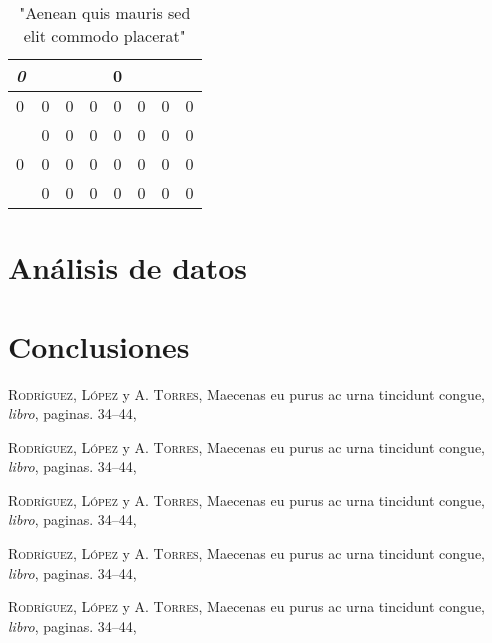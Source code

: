 \documentclass[letterpaper, 12px]{article}
\begin{document}
\begin{table}[h]
\centering
\begin{tabular}{|lll|lllllll|}
\hline
\multicolumn{3}{|l|}{\textit{0}}   & \multicolumn{7}{c|}{0}                                                                                                                             \\ 
\hline
\multicolumn{3}{|l|}{0}                  & \multicolumn{1}{l|}{0} & \multicolumn{1}{l|}{0} & \multicolumn{1}{l|}{0} & \multicolumn{1}{l|}{0} & \multicolumn{1}{l|}{0} & \multicolumn{1}{l|}{0} & 0 \\ 
\hline
\multicolumn{3}{|l|}{\multirow{3}{*}{0}} & \multicolumn{1}{l|}{0} & \multicolumn{1}{l|}{0} & \multicolumn{1}{l|}{0} & \multicolumn{1}{l|}{0} & \multicolumn{1}{l|}{0} & \multicolumn{1}{l|}{0} & 0 \\ 
\cline{4-10} 
\multicolumn{3}{|l|}{}                   & \multicolumn{1}{l|}{0} & \multicolumn{1}{l|}{0} & \multicolumn{1}{l|}{0} & \multicolumn{1}{l|}{0} & \multicolumn{1}{l|}{0} & \multicolumn{1}{l|}{0} & 0 \\ 
\cline{4-10} 
\multicolumn{3}{|l|}{}                   & \multicolumn{1}{l|}{0} & \multicolumn{1}{l|}{0} & \multicolumn{1}{l|}{0} & \multicolumn{1}{l|}{0} & \multicolumn{1}{l|}{0} & \multicolumn{1}{l|}{0} & 0 \\ 
\hline

\end{tabular}

\caption{"Aenean quis mauris sed elit commodo placerat"}
\label{tab:datos obtenidos pt2}
\end{table}

\lipsum[16]

\section{Análisis de datos}

\lipsum[17-18]
\section*{Conclusiones}
\lipsum[19-23]

\begin{thebibliography}{X}
 \textsc{Rodríguez, López} y \textsc{A. Torres}, Maecenas eu purus ac urna tincidunt congue,
\textit{libro}, paginas. 34--44,

 \textsc{Rodríguez, López} y \textsc{A. Torres}, Maecenas eu purus ac urna tincidunt congue,
\textit{libro}, paginas. 34--44,

 \textsc{Rodríguez, López} y \textsc{A. Torres}, Maecenas eu purus ac urna tincidunt congue,
\textit{libro}, paginas. 34--44,

 \textsc{Rodríguez, López} y \textsc{A. Torres}, Maecenas eu purus ac urna tincidunt congue,
\textit{libro}, paginas. 34--44,

 \textsc{Rodríguez, López} y \textsc{A. Torres}, Maecenas eu purus ac urna tincidunt congue,
\textit{libro}, paginas. 34--44,
\end{thebibliography}
\end{document}
